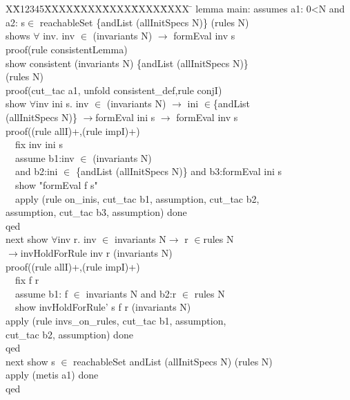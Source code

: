 \documentclass[final]{IEEEtran}
\newlength{\fminilength}
\newenvironment{fmini}[1][\linewidth]
  {\setlength{\fminilength}{#1\fboxsep-2\fboxrule}%
   \vspace{2ex}\noindent\begin{lrbox}{\fminibox}\begin{minipage}{\fminilength}%
   \mbox{ }\hfill\vspace{-2.5ex}}%
  {\end{minipage}\end{lrbox}\vspace{1ex}\hspace{0ex}%
   \framebox{\usebox{\fminibox}}}
\newenvironment{specification}
{\noindent\scriptsize
\tt\begin{fmini}\begin{tabbing}X\=X12345\=XXXX\=XXXX\=XXXX\=XXXX\=XXXX
\=\+\kill} {\end{tabbing}\normalfont\end{fmini}}
\def \twoSpaces {\ \ }
\begin{document}
\begin{specification}
lemma main:
  assumes  a1: 0<N and \\
  a2: s$\in$ reachableSet \{andList (allInitSpecs N)\} (rules N)\\
  shows $\forall$ inv. inv $\in$ (invariants N) $\longrightarrow$ formEval inv s\\
proof(rule consistentLemma)\\
  show consistent (invariants N) \{andList (allInitSpecs N)\}\\ (rules N)\\
 proof(cut\_tac a1, unfold consistent\_def,rule conjI)\\
   show  $\forall$inv ini s. inv $\in$ (invariants N)
$\longrightarrow$ ini $\in$\{andList \\
(allInitSpecs N)\} $\longrightarrow$formEval ini s $\longrightarrow$ formEval inv s\\
proof((rule allI)+,(rule impI)+)\\
\twoSpaces   fix inv ini s\\
\twoSpaces   assume b1:inv $\in$ (invariants N) \\
\twoSpaces     and b2:ini $\in$ \{andList (allInitSpecs N)\}  and b3:formEval ini s\\
\twoSpaces   show "formEval f s"\\
\twoSpaces   apply (rule on\_inis, cut\_tac b1, assumption, cut\_tac b2, \\
assumption, cut\_tac b3, assumption) done\\
    qed\\

next   show  $\forall$inv r. inv $\in$ invariants N$\longrightarrow$
 r $\in$rules N\\
 $\longrightarrow$invHoldForRule inv r (invariants N) \\

   proof((rule allI)+,(rule impI)+)\\
\twoSpaces      fix f r \\
\twoSpaces         assume b1: f $\in$ invariants N  and b2:r $\in$ rules N\\

\twoSpaces     show invHoldForRule' s f r (invariants N)\\
  apply (rule invs\_on\_rules, cut\_tac b1, assumption, \\
  cut\_tac b2, assumption) done\\
qed\\
next show s $\in$ reachableSet {andList (allInitSpecs N)} (rules N)\\
  apply (metis a1) done\\
qed\\
\end{specification}
\end{document}
